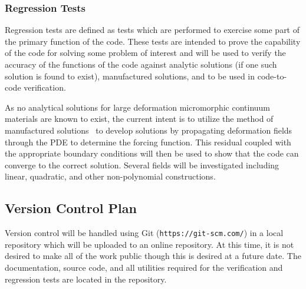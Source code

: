 \subsubsection{Regression Tests}

Regression tests are defined as tests which are performed to exercise some part of the primary function of the code. These tests are intended to prove the capability of the code for solving some problem of interest and will be used to verify the accuracy of the functions of the code against analytic solutions (if one such solution is found to exist), manufactured solutions, and to be used in code-to-code verification.

As no analytical solutions for large deformation micromorphic continuum materials are known to exist, the current intent is to utilize the method of manufactured solutions~\cite{bib:alari2000} to develop solutions by propagating deformation fields through the PDE to determine the forcing function. This residual coupled with the appropriate boundary conditions will then be used to show that the code can converge to the correct solution. Several fields will be investigated including linear, quadratic, and other non-polynomial constructions.

\subsection{Version Control Plan}

Version control will be handled using Git (\verb|https://git-scm.com/|) in a local repository which will be uploaded to an online repository. At this time, it is not desired to make all of the work public though this is desired at a future date. The documentation, source code, and all utilities required for the verification and regression tests are located in the repository.